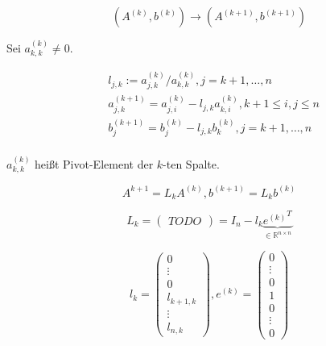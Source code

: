 \documentclass[a4paper,10pt]{scrartcl}
\newtheorem[L]{satz}{Satz}[section]
\newtheorem[S]{beweis}{Beweis}
\newtheorem[S]{beh}{Behauptung}
\begin{document}
\[
  (A^{(k)}, b^{(k)}) \rightarrow (A^{(k+1)}, b^{(k+1)})
\]

\begin{comment}
\[
  \begin{pmatrix}
    a_{1, 1}^(1) & & & & \dots & a_{1, n}^(1) & b_1^{(1)} \\
    0 & a_%
    0 & 0 & \ddots & & &  & \vdots & \vdots \\
    0 & 0 & 0 & a_{k, k}^(k) & \dots & a_{k, n}^(k) & b_k^{(k)} \\
    \vdots & \vdots & \vdots & \vdots & & \vdots & \vdots \\
    0 & 0 & 0 & a_{n, k}^(k) & \dots & a_{n, n}^(k) & b_n^{(k)} \\
  \end{pmatrix}
\]
\end{comment}

Sei $a_{k,k}^{(k)} \neq 0$.

\begin{align*}
  &l_{j, k} := a_{j,k}^{(k)} / a_{k,k}^{(k)}, j=k+1,\dots, n \\
  &a_{j,k}^{(k+1)} = a_{j,i}^{(k)} - l_{j, k} a_{k,i}^{(k)}, k+1 \leq i,j \leq n \\
  &b_{j}^{(k+1)} = b_{j}^{(k)} - l_{j, k} b_{k}^{(k)}, j=k+1,\dots, n \\
\end{align*}

$a_{k,k}^{(k)}$ heißt Pivot-Element der $k$-ten Spalte.

\[
  A^{k+1} = L_k A^{(k)}, b^{(k+1)} = L_k b^{(k)}
\]

\[
  L_k = \begin{pmatrix}
    TODO
  \end{pmatrix}
  = I_n - l_k \underbrace{{{e^{(k)}}^T}}_{\in \mathbb{R}^{n \times n}}
\]

\[
  l_k = \begin{pmatrix}
          0 \\ \vdots \\ 0 \\ l_{k+1,k} \\ \vdots \\ l_{n,k}
        \end{pmatrix},
  e^{(k)} = \begin{pmatrix} 0 \\ \vdots \\ 0 \\ 1 \\ 0 \\ \vdots \\ 0 \end{pmatrix} %
\]
\end{document}
